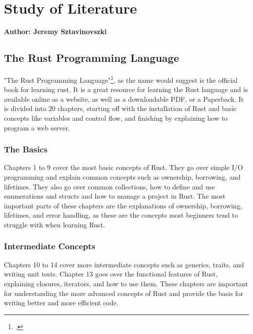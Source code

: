 \chapter{Study of Literature}
\textbf{Author: Jeremy Sztavinovszki} 

\section{The Rust Programming Language}
"The Rust Programming Language"\footcite{the-rust-programming-language}, as the name would suggest is the official book for learning rust. It is a great resource for learning the Rust language
and is available online as a website, as well as a downloadable PDF, or a Paperback. It is divided into 20 chapters, starting off with the installation
of Rust and basic concepts like variables and control flow, and finishing by explaining how to program a web server.

\subsection{The Basics}
Chapters 1 to 9 cover the most basic concepts of Rust. They go over simple I/O programming and explain common concepts such as ownership, borrowing, and lifetimes.
They also go over common collections, how to define and use enumerations and structs and how to manage a project in Rust. The most important parts of these chapters
are the explanations of ownership, borrowing, lifetimes, and error handling, as these are the concepts most beginners tend to struggle with when learning Rust.

\subsection{Intermediate Concepts}
Chapters 10 to 14 cover more intermediate concepts such as generics, traits, and writing unit tests. Chapter 13 goes over the functional features of Rust, explaining
closures, iterators, and how to use them. These chapters are important for understanding the more advanced concepts of Rust and provide the basis for writing better
and more efficient code.

